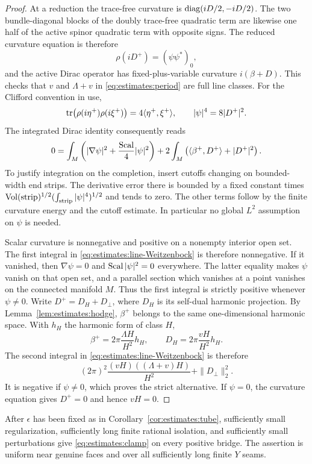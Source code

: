 \begin{proof}
At a reduction the trace-free curvature is
$\operatorname{diag}(iD/2,-iD/2)$.  The two bundle-diagonal blocks of the doubly
trace-free quadratic term are likewise one half of the active
spinor quadratic term with opposite signs.  The reduced curvature
equation is therefore
\[
             \rho(iD^+)=(\psi\psi^*)_0,
\]
and the active Dirac operator has fixed-plus-variable curvature
$i(\beta+D)$.  This checks that $v$ and $\Lambda+v$ in
\eqref{eq:estimates:period} are full line classes.
For the Clifford convention in use,
\[
 \operatorname{tr}\bigl(\rho(i\eta^+)\rho(i\xi^+)\bigr)
       =4\langle\eta^+,\xi^+\rangle,
 \qquad |\psi|^4=8|D^+|^2.
\]
The integrated Dirac identity consequently reads
\begin{equation}
 0=\int_M\left(|\nabla\psi|^2+\frac{\operatorname{Scal}}{4}|\psi|^2\right)
       +2\int_M\left(\langle\beta^+,D^+\rangle+|D^+|^2\right).
 \label{eq:estimates:line-Weitzenbock}
\end{equation}
To justify integration on the completion, insert cutoffs changing
on bounded-width end strips.  The derivative error there is
bounded by a fixed constant times
$\operatorname{Vol}(\mathrm{strip})^{1/2}
 (\int_{\mathrm{strip}}|\psi|^4)^{1/2}$ and tends to zero.
The other terms follow by the finite curvature energy and the
cutoff estimate.  In particular no global $L^2$ assumption on
$\psi$ is needed.

Scalar curvature is nonnegative and positive on a nonempty interior
open set.  The first integral in
\eqref{eq:estimates:line-Weitzenbock} is therefore nonnegative.
If it vanished, then $\nabla\psi=0$ and
$\operatorname{Scal}|\psi|^2=0$ everywhere.  The latter equality makes $\psi$
vanish on that open set, and a parallel section which vanishes at
a point vanishes on the connected manifold $M$.  Thus the first
integral is strictly positive whenever $\psi\ne0$.  Write
$D^+=D_H+D_\perp$, where $D_H$ is its self-dual harmonic projection.
By Lemma~\ref{lem:estimates:hodge}, $\beta^+$ belongs to the same
one-dimensional harmonic space.  With $h_H$ the harmonic form of
class $H$,
\[
 \beta^+=2\pi\frac{\Lambda H}{H^2}h_H,
 \qquad D_H=2\pi\frac{vH}{H^2}h_H.
\]
The second integral in \eqref{eq:estimates:line-Weitzenbock} is
therefore
\[
 (2\pi)^2\frac{(vH)((\Lambda+v)H)}{H^2}
                         +\|D_\perp\|_2^2.
\]
It is negative if $\psi\ne0$, which proves the strict alternative.
If $\psi=0$, the curvature equation gives $D^+=0$ and hence $vH=0$.
\end{proof}

\begin{lemma}
\label{lem:estimates:vertices}
After $\epsilon$ has been fixed as in
Corollary~\ref{cor:estimates:tube}, sufficiently small regularization,
sufficiently long finite rational isolation, and sufficiently small
perturbations give \eqref{eq:estimates:clamp} on every positive bridge.
The assertion is uniform near genuine faces and over all sufficiently
long finite $Y$ seams.
\end{lemma}

